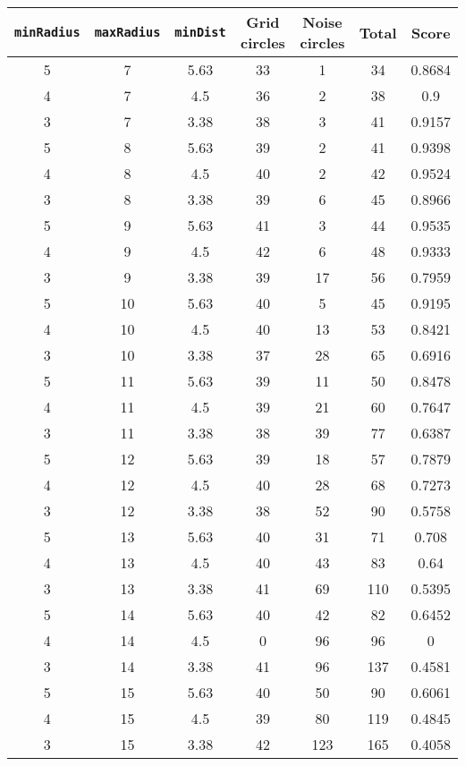 \documentclass[letterpaper, 12pt]{article}
\begin{document}
\begin{longtable}{|c|c|c|c|c|c|c|}
\hline
\textbf{\texttt{minRadius}} & \textbf{\texttt{maxRadius}} & \textbf{\texttt{minDist}} & \textbf{Grid circles} & \textbf{Noise circles} & \textbf{Total} & \textbf{Score} \\
\hline
5 & 7 & 5.63 & 33 & 1 & 34 & 0.8684 \\
\hline
4 & 7 & 4.5 & 36 & 2 & 38 & 0.9 \\
\hline
3 & 7 & 3.38 & 38 & 3 & 41 & 0.9157 \\
\hline
5 & 8 & 5.63 & 39 & 2 & 41 & 0.9398 \\
\hline
4 & 8 & 4.5 & 40 & 2 & 42 & 0.9524 \\
\hline
3 & 8 & 3.38 & 39 & 6 & 45 & 0.8966 \\
\hline
5 & 9 & 5.63 & 41 & 3 & 44 & 0.9535 \\
\hline
4 & 9 & 4.5 & 42 & 6 & 48 & 0.9333 \\
\hline
3 & 9 & 3.38 & 39 & 17 & 56 & 0.7959 \\
\hline
5 & 10 & 5.63 & 40 & 5 & 45 & 0.9195 \\
\hline
4 & 10 & 4.5 & 40 & 13 & 53 & 0.8421 \\
\hline
3 & 10 & 3.38 & 37 & 28 & 65 & 0.6916 \\
\hline
5 & 11 & 5.63 & 39 & 11 & 50 & 0.8478 \\
\hline
4 & 11 & 4.5 & 39 & 21 & 60 & 0.7647 \\
\hline
3 & 11 & 3.38 & 38 & 39 & 77 & 0.6387 \\
\hline
5 & 12 & 5.63 & 39 & 18 & 57 & 0.7879 \\
\hline
4 & 12 & 4.5 & 40 & 28 & 68 & 0.7273 \\
\hline
3 & 12 & 3.38 & 38 & 52 & 90 & 0.5758 \\
\hline
5 & 13 & 5.63 & 40 & 31 & 71 & 0.708 \\
\hline
4 & 13 & 4.5 & 40 & 43 & 83 & 0.64 \\
\hline
3 & 13 & 3.38 & 41 & 69 & 110 & 0.5395 \\
\hline
5 & 14 & 5.63 & 40 & 42 & 82 & 0.6452 \\
\hline
4 & 14 & 4.5 & 0 & 96 & 96 & 0 \\
\hline
3 & 14 & 3.38 & 41 & 96 & 137 & 0.4581 \\
\hline
5 & 15 & 5.63 & 40 & 50 & 90 & 0.6061 \\
\hline
4 & 15 & 4.5 & 39 & 80 & 119 & 0.4845 \\
\hline
3 & 15 & 3.38 & 42 & 123 & 165 & 0.4058 \\

\end{longtable}
\end{document}
